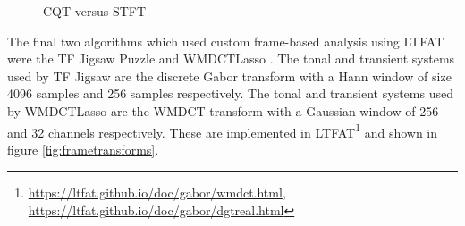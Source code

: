 \documentclass[letter,12pt]{article}
\begin{document}
\begin{figure}[ht]
	\vspace{0.1em}
	\hspace{0.35em}
	\caption{CQT versus STFT}
	\label{fig:cqtvstft}
\end{figure}

The final two algorithms which used custom frame-based analysis using LTFAT were the TF Jigsaw Puzzle \cite{tfjigsaw} and WMDCTLasso \cite{wmdct}. The tonal and transient systems used by TF Jigsaw are the discrete Gabor transform with a Hann window of size 4096 samples and 256 samples respectively. The tonal and transient systems used by WMDCTLasso are the WMDCT transform with a Gaussian window of 256 and 32 channels respectively. These are implemented in LTFAT\footnote{\url{https://ltfat.github.io/doc/gabor/wmdct.html}, \url{https://ltfat.github.io/doc/gabor/dgtreal.html}} and shown in figure \ref{fig:frametransforms}.
\end{document}
